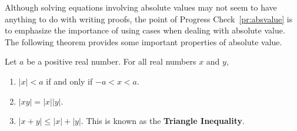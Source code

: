 Although solving equations involving absolute values may not seem to have anything to do with writing proofs, the point of Progress Check~\ref{pr:absvalue} is to emphasize the importance of using cases when dealing with absolute value.  The following theorem provides some important properties of absolute value.

\begin{theorem}\label{T:absvalue}
Let $a$ be a positive real number.  For all real numbers $x$ and $y$,

\begin{enumerate}
\item $\left| x \right| < a$ if and only if $-a < x < a$.
\label{T:absvalue-1}%
\item $\left| xy \right| = \left| x \right| \left| y \right|$.
\label{T:absvalue-2}%
\item $\left| x + y \right| \leq \left| x \right| + \left| y \right|$.
\label{T:absvalue-3}%
  This is known as the \textbf{Triangle Inequality}.
%
\end{enumerate}
\end{theorem}

